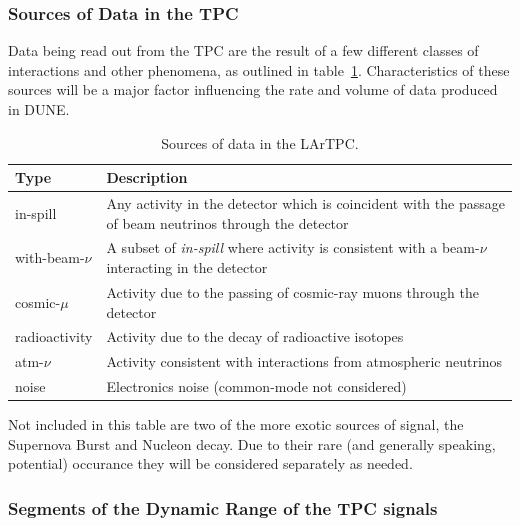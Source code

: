 \subsubsection{Sources of Data in the TPC}

Data being read out from the TPC are the result of a few different classes of interactions and other phenomena,
as outlined in table~\ref{tab:dune-data-sources}. Characteristics of these sources will
be a major factor influencing the rate and volume of data produced in DUNE.
\begin{table}[ht!]
	\centering
	\begin{tabular}{| p{1in} | p{4.5in} |}
		\hline
	\textbf{Type} & \textbf{Description} \\ \hline
		
	in-spill & Any activity in the detector which is coincident with
	the passage of beam neutrinos through the detector \\ \hline
	
	with-beam-$\nu$ & A subset of \textit{in-spill} where activity is
	consistent with a beam-$\nu$ interacting in the detector \\ \hline
	
	cosmic-$\mu$ & Activity due to the passing of cosmic-ray muons
	through the detector \\ \hline
	
	radioactivity & Activity due to the decay of radioactive
	isotopes \\ \hline
	
	atm-$\nu$ & Activity consistent with interactions from
	atmospheric neutrinos \\ \hline
	
	noise & Electronics noise (common-mode not considered) \\ \hline

	\end{tabular}
	\caption{Sources of data in the LArTPC.}
	\label{tab:dune-data-sources}
\end{table}

Not included in this table are two of the more exotic sources of signal, the Supernova Burst and Nucleon decay.
Due to their rare (and generally speaking, potential) occurance they will be considered separately as needed.


\subsubsection{Segments of the Dynamic Range of the TPC signals}

